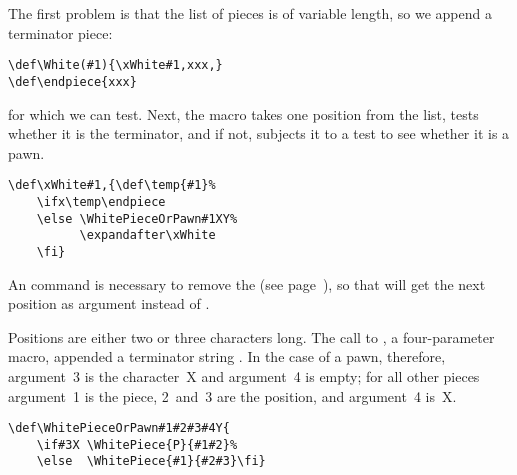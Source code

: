 The first problem is that the list of pieces 
is of variable length, so we append a terminator piece:
\begin{verbatim}
\def\White(#1){\xWhite#1,xxx,}
\def\endpiece{xxx}
\end{verbatim}
for which we can test.
Next, the macro  takes one position from the list,
tests whether it is the terminator, and if not,
subjects it to a test to see whether it is a pawn.
\begin{verbatim}
\def\xWhite#1,{\def\temp{#1}%
    \ifx\temp\endpiece 
    \else \WhitePieceOrPawn#1XY%
          \expandafter\xWhite 
    \fi}
\end{verbatim}
An  command is necessary to remove the
 (see page~\pageref{after:cond}), so that 
 will get the next position as argument
instead of .

Positions  are either two or three characters long.
The call to , a four-parameter macro,
appended a terminator string . 
In the case of a pawn, therefore, argument~3 is the character~\n X
and argument~4 is empty; for all other pieces argument~1
is the piece, 2~and~3 are the position, and argument~4 is~\n X.
\begin{verbatim}
\def\WhitePieceOrPawn#1#2#3#4Y{
    \if#3X \WhitePiece{P}{#1#2}%
    \else  \WhitePiece{#1}{#2#3}\fi}
\end{verbatim}

